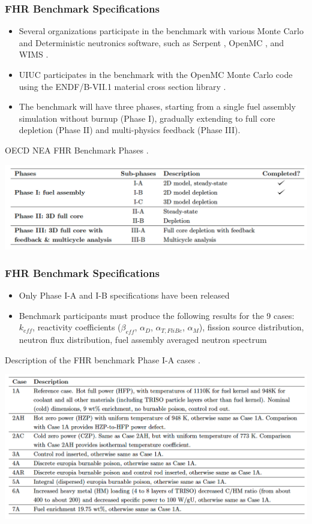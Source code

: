 \begin{frame}
    \frametitle{FHR Benchmark Specifications}
    \begin{itemize}
        \item Several organizations participate in the benchmark with various Monte Carlo
        and Deterministic neutronics software, such as Serpent \cite{leppanen_serpent_2014}, 
        OpenMC \cite{romano_openmc_2013}, and WIMS \cite{lindley_current_2017}. 
        \item UIUC participates in the benchmark with the OpenMC Monte Carlo code 
        \cite{romano_openmc_2013} using the ENDF/B-VII.1 material cross section library 
        \cite{chadwick_endf/b-vii.1_2011}.
        \item The benchmark will have three phases, starting from a single fuel assembly
        simulation without burnup (Phase I), gradually extending to full core depletion
        (Phase II) and multi-physics feedback (Phase III). 
    \end{itemize}
    \begin{table}
        \caption{\acrfull{OECD} \acrfull{NEA} \acrfull{FHR} Benchmark Phases 
        \cite{noauthor_fluoride_nodate}.}
        \includegraphics[width=0.8\linewidth]{figures/benchmark-phases.png} 
    \end{table}
\end{frame}

\begin{frame}
    \frametitle{FHR Benchmark Specifications}
    \begin{itemize}
        \item Only Phase I-A and I-B specifications have been released 
        \item Benchmark participants must produce the following results for 
        the 9 cases: $k_{eff}$, reactivity coefficients ($\beta_{eff}$, 
        $\alpha_D$, $\alpha_{T, FliBe}$, $\alpha_M$), fission source distribution, 
        neutron flux distribution, fuel assembly averaged neutron spectrum
    \end{itemize}
    \begin{table}
        \caption{Description of the \acrlong{FHR} benchmark Phase I-A cases 
        \cite{noauthor_fluoride_nodate}.}
        \includegraphics[width=0.8\linewidth]{figures/benchmark-cases.png} 
    \end{table}
\end{frame}